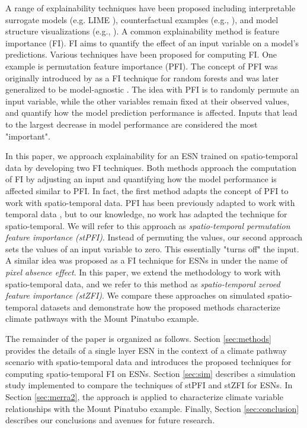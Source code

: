 \documentclass[AMS,STIX2COL]{WileyNJD-v2}
\begin{document}
A range of explainability techniques have been proposed including interpretable surrogate models (e.g. LIME \citep{ribeiro2016}), counterfactual examples (e.g., \citep{mothilal2020}), and model structure visualizations (e.g., \cite{urbanek2008}). A common  explainability method is feature importance (FI). FI aims to quantify the effect of an input variable on a model's predictions. Various techniques have been proposed for computing FI. One example is permutation feature importance (PFI). The concept of PFI was originally introduced by \citet{breiman2001} as a FI technique for random forests and was later generalized to be model-agnostic \citep{fisher2019}. The idea with PFI is to randomly permute an input variable, while the other variables remain fixed at their observed values, and quantify how the model prediction performance is affected. Inputs that lead to the largest decrease in model performance are considered the most "important".

In this paper, we approach explainability for an ESN trained on spatio-temporal data by developing two FI techniques. Both methods approach the computation of FI by adjusting an input and quantifying how the model performance is affected similar to PFI. In fact, the first method adapts the concept of PFI to work with spatio-temporal data. PFI has been previously adapted to work with temporal data \citep{sood2021}, but to our knowledge, no work has adapted the technique for spatio-temporal. We will refer to this approach as \emph{spatio-temporal permutation feature importance (stPFI)}. Instead of permuting the values, our second approach sets the values of an input variable to zero. This essentially "turns off" the input. A similar idea was proposed as a FI technique for ESNs in \citet{arrieta2022} under the name of \emph{pixel absence effect}. In this paper, we extend the methodology to work with spatio-temporal data, and we refer to this method as \emph{spatio-temporal zeroed feature importance (stZFI)}. We compare these approaches on simulated spatio-temporal datasets and demonstrate how the proposed methods characterize climate pathways with the Mount Pinatubo example.

The remainder of the paper is organized as follows. Section \ref{sec:methods} provides the details of a single layer ESN in the context of a climate pathway scenario with spatio-temporal data and introduces the proposed techniques for computing spatio-temporal FI on ESNs. Section \ref{sec:sim} describes a simulation study implemented to compare the techniques of stPFI and stZFI for ESNs. In Section \ref{sec:merra2}, the approach is applied to characterize climate variable relationships with the Mount Pinatubo example. Finally, Section \ref{sec:conclusion} describes our conclusions and avenues for future research.
\end{document}
